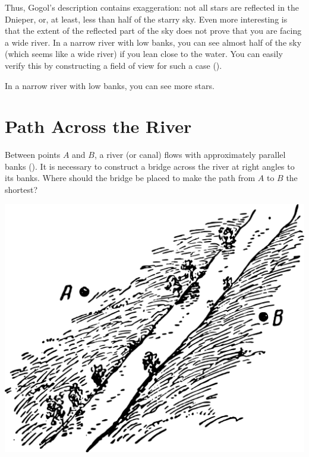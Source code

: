 Thus, Gogol's description contains exaggeration: not all stars are reflected in the Dnieper, or, at least, less than half of the starry sky. Even more interesting is that the extent of the reflected part of the sky does not prove that you are facing a wide river. In a narrow river with low banks, you can see almost half of the sky (which seems like a wide river) if you lean close to the water. You can easily verify this by constructing a field of view for such a case ().


In a narrow river with low banks, you can see more stars.


\section{Path Across the River}
\label{sec-2.17}



\ques Between points $A$ and $B$, a river (or canal) flows with approximately parallel banks (). It is necessary to construct a bridge across the river at right angles to its banks. Where should the bridge be placed to make the path from $A$ to $B$ the shortest?

\begin{marginfigure}%
\centering
\includegraphics[width=1.\textwidth]{figures/ch-02/fig-056.pdf}
\end{marginfigure}


